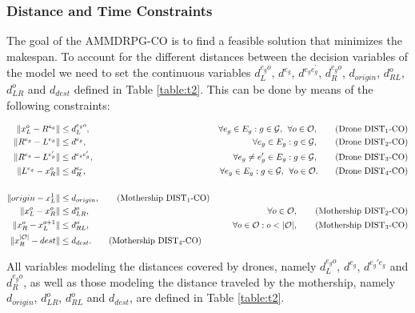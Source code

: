 \documentclass[10pt,a4paper]{elsarticle}
\def\AMDCO{{\sf AMMDRPG-CO\xspace}}
\begin{document}
\subsubsection*{Distance and Time Constraints}
\noindent
The goal of the \AMDCO\xspace is to find a feasible solution that minimizes the makespan. To account for the different distances between the decision variables of the model we need to set the continuous variables $d_L^{e_go}$, $d^{e_g}$, $d^{e_ge^\prime_g}$, $d_R^{e_go}$, $d_{origin}$, $d_{RL}^o$, $d_{LR}^o$ and $d_{dest}$ defined in Table \ref{table:t2}. This can be done by means of the following constraints:

\begin{align*}
\|x_L^o- R^{e_g}\| & \leq  d_L^{e_go},  &\forall e_g\in E_g:g\in \mathcal{G}, \:\:\forall o\in \mathcal O, \tag{Drone DIST$_{1}$-CO} \label{eq:drone-d1-async-CO}\\
\|R^{e_g}- L^{e_g}\| & \leq  d^{e_g},  &\forall e_g\in E_g:g\in \mathcal{G}, \tag{Drone DIST$_{2}$-CO} \label{eq:drone-d2-async-CO}\\
\|R^{e_g}- L^{e'_g}\| & \leq  d^{e_ge'_g}, &\forall e_g\neq e_g'\in E_g:g\in \mathcal{G}, \tag{Drone DIST$_{3}$-CO} \label{eq:drone-d3-async-CO}\\
\|L^{e_g}- x_R^o\| & \leq  d_R^{e_o}, &\forall e_g\in E_g:g\in \mathcal{G},\:\:\forall o\in \mathcal O. \tag{Drone DIST$_{4}$-CO} \label{eq:drone-d4-async-CO}\\\\
\|origin - x_L^1\| & \leq d_{origin}, \tag{Mothership DIST$_1$-CO}\label{eq:mothership-d1-async-CO}\\
\|x_L^o - x_R^{o}\| & \leq d_{LR}^{o}, &\forall o\in\mathcal O, \tag{Mothership DIST$_{2}$-CO}\label{eq:mothership-d3-async-CO}\\
\|x_R^o - x_L^{o+1}\| & \leq d_{RL}^{o}, &\forall o\in\mathcal O:o<|\mathcal O|, \tag{Mothership DIST$_{3}$-CO}\label{eq:mothership-d4-async-CO}\\
\|x_R^{|\mathcal O|} - dest\| & \leq d_{dest}. \tag{Mothership DIST$_4$-CO}\label{eq:mothership-d6-async-CO}
\end{align*}

\noindent
All variables modeling the distances covered by drones, namely $d_L^{e_go}$, $d^{e_g}$, $d^{e_g'e_g}$ and $d_R^{e_go}$,  as well as those modeling the distance traveled by the mothership, namely $d_{origin}$, $d_{LR}^o$, $d_{RL}^o$ and $d_{dest}$, are defined in Table \ref{table:t2}. 
\end{document}
